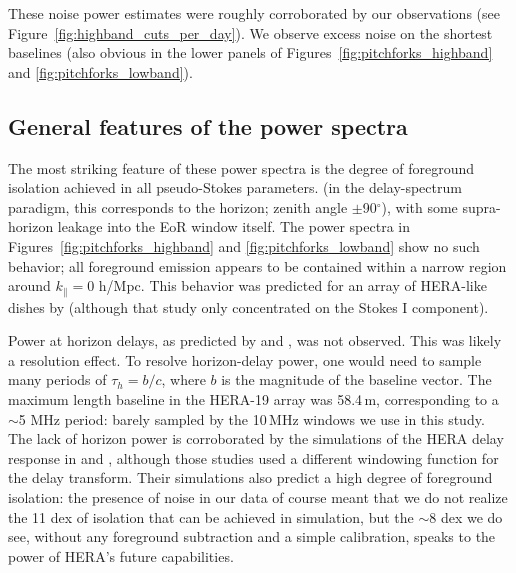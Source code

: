 \documentclass[twocolumn, trackchanges]{aastex61}
\begin{document}
These noise power estimates were roughly corroborated by our observations (see Figure~\ref{fig:highband_cuts_per_day}). We observe excess noise on the shortest baselines (also obvious in the lower panels of Figures~\ref{fig:pitchforks_highband} and \ref{fig:pitchforks_lowband}). 

\subsection{General features of the power spectra}
\label{subsec:general_features}
The most striking feature of these power spectra is the degree of foreground isolation achieved in all pseudo-Stokes parameters.  (in the delay-spectrum paradigm, this corresponds to the horizon; zenith angle $\pm$90$^{\circ}$), with some supra-horizon leakage \citep{Pober13} into the EoR window itself. The power spectra in Figures~\ref{fig:pitchforks_highband} and \ref{fig:pitchforks_lowband} show no such behavior; all foreground emission appears to be contained within a narrow region around $k_{\parallel}=0$ h/Mpc. This behavior was predicted for an array of HERA-like dishes by \citealt{Nithya.15b} (although that study only concentrated on the Stokes I component). 


Power at horizon delays, as predicted by \cite{Nithya.15b} and \cite{Neben.16}, was not observed. This was likely a resolution effect. To resolve horizon-delay power, one would need to sample many periods of $\tau_h=b/c$, where $b$ is the magnitude of the baseline vector. The maximum length baseline in the HERA-19 array was 58.4\,m, corresponding to a $\sim$5 MHz period: barely sampled by the 10\,MHz windows we use in this study. The lack of horizon power is corroborated by the simulations of the HERA delay response in \cite{Ewall-Wice.16} and \cite{Thyagarajan.16}, although those studies used a different windowing function for the delay transform. Their simulations also predict a high degree of foreground isolation: the presence of noise in our data of course meant that we do not realize the 11 dex of isolation that can be achieved in simulation, but the $\sim$8 dex we do see, without any foreground subtraction and a simple calibration, speaks to the power of HERA's future capabilities.
\end{document}
